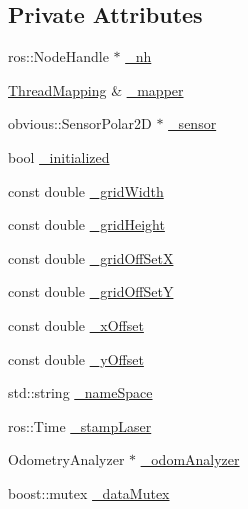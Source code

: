 \subsection*{Private Attributes}
\begin{DoxyCompactItemize}
\item 
ros\-::\-Node\-Handle $\ast$ \hyperlink{classohm__tsd__slam__ref_1_1ThreadLocalize_a339ec43d3843e2049120afd424a636f7}{\-\_\-nh}
\item 
\hyperlink{classohm__tsd__slam__ref_1_1ThreadMapping}{Thread\-Mapping} \& \hyperlink{classohm__tsd__slam__ref_1_1ThreadLocalize_a73a2ed65f92fbf13e82e7b00e8354c13}{\-\_\-mapper}
\item 
obvious\-::\-Sensor\-Polar2\-D $\ast$ \hyperlink{classohm__tsd__slam__ref_1_1ThreadLocalize_ad08189f4b2c11aa3f2d75384d89088f8}{\-\_\-sensor}
\item 
bool \hyperlink{classohm__tsd__slam__ref_1_1ThreadLocalize_a936d63f4a95f0102070be527a2636f8f}{\-\_\-initialized}
\item 
const double \hyperlink{classohm__tsd__slam__ref_1_1ThreadLocalize_a09c5ac4604a298725984646e683aa600}{\-\_\-grid\-Width}
\item 
const double \hyperlink{classohm__tsd__slam__ref_1_1ThreadLocalize_af9493e2cbbce37f693bbe632374d0d2a}{\-\_\-grid\-Height}
\item 
const double \hyperlink{classohm__tsd__slam__ref_1_1ThreadLocalize_a74254a193f989fd948778e780a340b9c}{\-\_\-grid\-Off\-Set\-X}
\item 
const double \hyperlink{classohm__tsd__slam__ref_1_1ThreadLocalize_ab12390e3a1727f9d1c47fc96747bd96c}{\-\_\-grid\-Off\-Set\-Y}
\item 
const double \hyperlink{classohm__tsd__slam__ref_1_1ThreadLocalize_a2bfa898645a8b505fbc317829da277cf}{\-\_\-x\-Offset}
\item 
const double \hyperlink{classohm__tsd__slam__ref_1_1ThreadLocalize_afd9255f70ea924f91b0e628d20245803}{\-\_\-y\-Offset}
\item 
std\-::string \hyperlink{classohm__tsd__slam__ref_1_1ThreadLocalize_ae67e48692aef6eadb8a12c2c89362c94}{\-\_\-name\-Space}
\item 
ros\-::\-Time \hyperlink{classohm__tsd__slam__ref_1_1ThreadLocalize_acf1975963191b84dd1fda914a4cc15ae}{\-\_\-stamp\-Laser}
\item 
Odometry\-Analyzer $\ast$ \hyperlink{classohm__tsd__slam__ref_1_1ThreadLocalize_a719b8e1a97ec5ba8e859f24b416699a0}{\-\_\-odom\-Analyzer}
\item 
boost\-::mutex \hyperlink{classohm__tsd__slam__ref_1_1ThreadLocalize_ad1b612e37ab54ffe1958cac7d5f9c89c}{\-\_\-data\-Mutex}

\end{DoxyCompactItemize}

